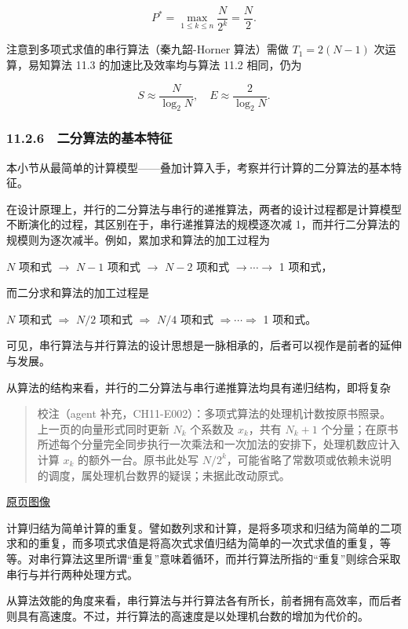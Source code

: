\documentclass[
  10pt,
  fontset=fandol]{ctexart}
\begin{document}
\[
P^*=\max_{1\le k\le n}\frac{N}{2^k}=\frac{N}{2}.
\]

注意到多项式求值的串行算法（秦九韶-Horner 算法）需做 \(T_1=2(N-1)\) 次运算，易知算法 11.3 的加速比及效率均与算法 11.2 相同，仍为

\[
S\approx\frac{N}{\log_2 N},\quad E\approx\frac{2}{\log_2 N}.
\]

\subsubsection{11.2.6　二分算法的基本特征}\label{ux4e8cux5206ux7b97ux6cd5ux7684ux57faux672cux7279ux5f81}

本小节从最简单的计算模型------叠加计算入手，考察并行计算的二分算法的基本特征。

在设计原理上，并行的二分算法与串行的递推算法，两者的设计过程都是计算模型不断演化的过程，其区别在于，串行递推算法的规模逐次减 1，而并行二分算法的规模则为逐次减半。例如，累加求和算法的加工过程为

\(N\) 项和式 \(\to\) \(N-1\) 项和式 \(\to\) \(N-2\) 项和式 \(\to\cdots\to\) 1 项和式，

而二分求和算法的加工过程是

\(N\) 项和式 \(\Rightarrow\) \(N/2\) 项和式 \(\Rightarrow\) \(N/4\) 项和式 \(\Rightarrow\cdots\Rightarrow\) 1 项和式。

可见，串行算法与并行算法的设计思想是一脉相承的，后者可以视作是前者的延伸与发展。

从算法的结构来看，并行的二分算法与串行递推算法均具有递归结构，即将复杂

\begin{quote}
校注（agent 补充，CH11-E002）：多项式算法的处理机计数按原书照录。上一页的向量形式同时更新 \(N_k\) 个系数及 \(x_k\)，共有 \(N_k+1\) 个分量；在原书所述每个分量完全同步执行一次乘法和一次加法的安排下，处理机数应计入计算 \(x_k\) 的额外一台。原书此处写 \(N/2^k\)，可能省略了常数项或依赖未说明的调度，属处理机台数界的疑误；未据此改动原式。
\end{quote}

\href{../../source-images/pdf-285.jpeg}{原页图像}

计算归结为简单计算的重复。譬如数列求和计算，是将多项求和归结为简单的二项求和的重复，而多项式求值是将高次式求值归结为简单的一次式求值的重复，等等。对串行算法这里所谓``重复''意味着循环，而并行算法所指的``重复''则综合采取串行与并行两种处理方式。

从算法效能的角度来看，串行算法与并行算法各有所长，前者拥有高效率，而后者则具有高速度。不过，并行算法的高速度是以处理机台数的增加为代价的。
\end{document}
